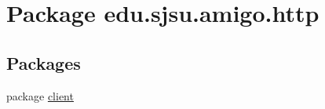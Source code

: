 \hypertarget{namespaceedu_1_1sjsu_1_1amigo_1_1http}{}\section{Package edu.\+sjsu.\+amigo.\+http}
\label{namespaceedu_1_1sjsu_1_1amigo_1_1http}
\subsection*{Packages}
\begin{DoxyCompactItemize}
\item 
package \hyperlink{namespaceedu_1_1sjsu_1_1amigo_1_1http_1_1client}{client}
\end{DoxyCompactItemize}
